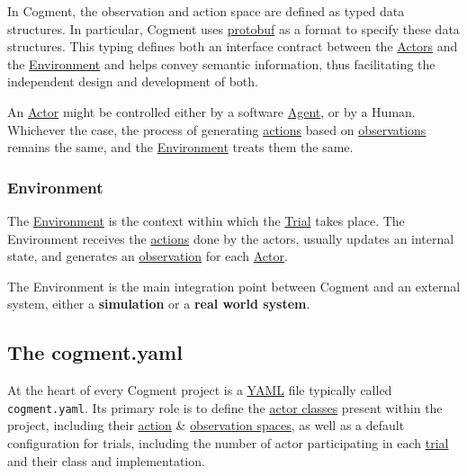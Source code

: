 In Cogment, the observation and action space are defined as typed data
structures. In particular, Cogment uses
\href{./glossary.md\#protocol-buffer}{protobuf} as a format to specify
these data structures. This typing defines both an interface contract
between the \href{./glossary.md\#actor}{Actors} and the
\href{./glossary.md\#environment}{Environment} and helps convey semantic
information, thus facilitating the independent design and development of
both.

An \href{./glossary.md\#actor}{Actor} might be controlled either by a
software \href{./glossary.md\#agent}{Agent}, or by a Human. Whichever
the case, the process of generating
\href{./glossary.md\#action}{actions} based on
\href{./glossary.md\#observation}{observations} remains the same, and
the \href{./glossary.md\#environment}{Environment} treats them the same.

\hypertarget{environment}{%
\subsubsection{Environment}\label{environment}}

The \href{./glossary.md\#environment}{Environment} is the context within
which the \href{./glossary.md\#trial}{Trial} takes place. The
Environment receives the \href{./glossary.md\#actions}{actions} done by
the actors, usually updates an internal state, and generates an
\href{./glossary.md\#observation}{observation} for each
\href{./glossary.md\#actor}{Actor}.

The Environment is the main integration point between Cogment and an
external system, either a \textbf{simulation} or a \textbf{real world
system}.

\hypertarget{the-cogment.yaml}{%
\subsection{The cogment.yaml}\label{the-cogment.yaml}}

At the heart of every Cogment project is a \href{https://yaml.org}{YAML}
file typically called \texttt{cogment.yaml}. Its primary role is to
define the \href{./glossary.md\#actor-class}{actor classes} present
within the project, including their
\href{./glossary.md\#action-space}{action} \&
\href{./glossary.md\#observation-space}{observation spaces}, as well as
a default configuration for trials, including the number of actor
participating in each \href{./glossary.md\#trial}{trial} and their class
and implementation.

